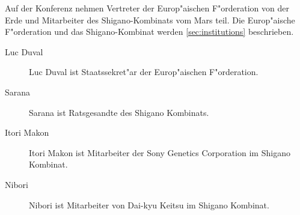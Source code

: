 
Auf der Konferenz nehmen Vertreter der Europ"aischen F"orderation von der Erde und Mitarbeiter des Shigano-Kombinats vom Mars teil. Die Europ"aische F"orderation und das Shigano-Kombinat werden \cref{sec:institutions} beschrieben.

\begin{description}
    \item [Luc Duval] Luc Duval ist Staatssekret"ar der Europ"aischen F"orderation.
    \item [Sarana] Sarana ist Ratsgesandte des Shigano Kombinats.
    \item [Itori Makon] Itori Makon ist Mitarbeiter der Sony Genetics Corporation im Shigano Kombinat.
    \item [Nibori] Nibori ist Mitarbeiter von Dai-kyu Keitsu im Shigano Kombinat.
\end{description}
